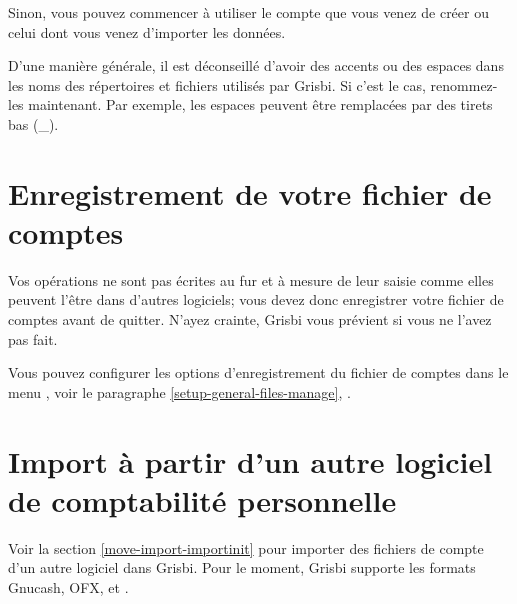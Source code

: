 Sinon, vous pouvez commencer à utiliser le compte que vous venez de créer ou celui dont vous venez d'importer les données.

D'une manière générale, il est déconseillé d'avoir des accents ou des espaces dans les noms des répertoires et fichiers utilisés par Grisbi. Si c'est le cas, renommez-les maintenant. Par exemple, les espaces peuvent être remplacées par des tirets bas (\_).



\section{Enregistrement de votre fichier de comptes\label{start-save}}


Vos opérations ne sont pas écrites au fur et à mesure de leur saisie comme elles peuvent l'être dans d'autres logiciels; vous devez donc enregistrer votre fichier de comptes avant de quitter. N'ayez crainte, Grisbi vous prévient si vous ne l'avez pas fait. 

Vous pouvez configurer les options d'enregistrement du fichier de comptes dans le menu , voir le paragraphe \vref{setup-general-files-manage}, .


\section{Import à partir d'un autre logiciel de comptabilité personnelle}

Voir la section \vref{move-import-importinit} pour importer des fichiers de compte d'un autre logiciel dans Grisbi. Pour le moment, Grisbi supporte les formats \gls{Gnucash}, \gls{OFX},  et .


